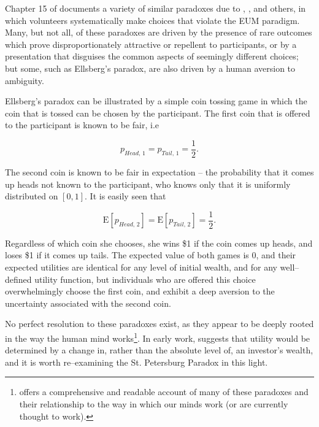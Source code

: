\documentclass[graybox,envcountchap,sectrefs]{svmono}\usepackage[]{graphicx}\usepackage[]{xcolor}
\begin{document}
\begin{appendices}
Chapter 15 of \citet{Levy2016} documents a variety of similar paradoxes
due to \citet{Allais1953}, \citet{Ellsberg1961}, and others, in
which volunteers systematically make choices that violate the EUM
paradigm. Many, but not all, of these paradoxes are driven by the
presence of rare outcomes which prove disproportionately attractive
or repellent to participants, or by a presentation that disguises
the common aspects of seemingly different choices; but some, such
as Ellsberg's paradox, are also driven by a human aversion to ambiguity.

Ellsberg's paradox can be illustrated by a simple coin tossing game
in which the coin that is tossed can be chosen by the participant.
The first coin that is offered to the participant is known to be fair,
i.e

\begin{equation}
p_{Head,\,1}=p_{Tail,\,1}=\frac{1}{2}.\label{eq:FairCoin1}
\end{equation}

The second coin is known to be fair in expectation -- the probability
that it comes up heads not known to the participant, who knows only
that it is uniformly distributed on $[0,1]$. It is easily seen that 

\begin{equation}
\mathrm{E}\left[p_{Head,\,2}\right]=\mathrm{E}\left[p_{Tail,\,2}\right]=\frac{1}{2}.\label{eq:FairCoin2}
\end{equation}

Regardless of which coin she chooses, she wins \$1 if the coin comes
up heads, and loses \$1 if it comes up tails. The expected value of
both games is 0, and their expected utilities are identical for any
level of initial wealth, and for any well--defined utility function,
but individuals who are offered this choice overwhelmingly choose
the first coin, and exhibit a deep aversion to the uncertainty associated
with the second coin. 

No perfect resolution to these paradoxes exist, as they appear to
be deeply rooted in the way the human mind works\footnote{\citet{KahnemanTversky2011} offers a comprehensive and readable account
of many of these paradoxes and their relationship to the way in which
our minds work (or are currently thought to work). }. In early work, \citet{Markowitz1952b} suggests that utility would
be determined by a change in, rather than the absolute level of, an
investor's wealth, and it is worth re--examining the St. Petersburg
Paradox in this light. 


\end{appendices}
\end{document}
